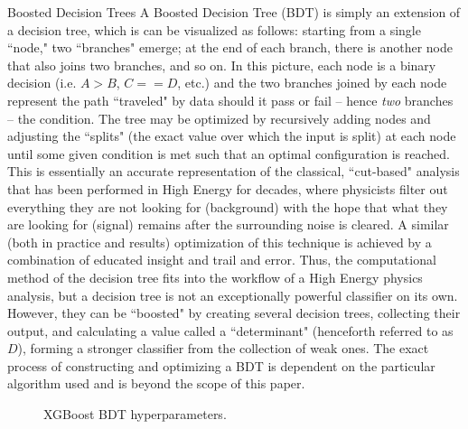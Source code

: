 \begin{section}{Boosted Decision Trees}
A Boosted Decision Tree (BDT) is simply an extension of a decision tree, which is can be visualized as follows: starting from a single ``node," two ``branches" emerge; at the end of each branch, there is another node that also joins two branches, and so on. In this picture, each node is a binary decision (i.e. $A > B$, $C == D$, etc.) and the two branches joined by each node represent the path ``traveled" by data should it pass or fail -- hence \textit{two} branches -- the condition. The tree may be optimized by recursively adding nodes and adjusting the ``splits" (the exact value over which the input is split) at each node until some given condition is met such that an optimal configuration is reached. This is essentially an accurate representation of the classical, ``cut-based" analysis that has been performed in High Energy for decades, where physicists filter out everything they are not looking for (background) with the hope that what they are looking for (signal) remains after the surrounding noise is cleared. A similar (both in practice and results) optimization of this technique is achieved by a combination of educated insight and trail and error. Thus, the computational method of the decision tree fits into the workflow of a High Energy physics analysis, but a decision tree is not an exceptionally powerful classifier on its own. However, they can be ``boosted" by creating several decision trees, collecting their output, and calculating a value called a ``determinant" (henceforth referred to as $D$), forming a stronger classifier from the collection of weak ones. The exact process of constructing and optimizing a BDT is dependent on the particular algorithm used and is beyond the scope of this paper.

\begin{figure}[htb]
\begin{center}

\end{center}
\caption{XGBoost BDT hyperparameters\cite{cite-xgboost-params}.}
\label{fig:bdt-knobs}
\end{figure}
\end{section}